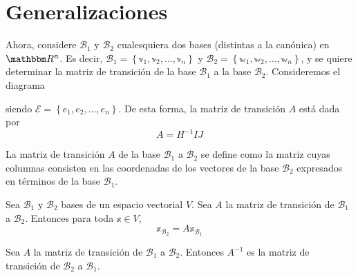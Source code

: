 \section*{Generalizaciones}

Ahora, considere $\mathcal{B}_1$ y $\mathcal{B}_2$ cualesquiera dos bases (distintas a la canónica) en $\RR[n]$. Es decir, $\mathcal{B}_1 = \left\{ \mathbb{v}_1, \mathbb{v}_2, \dots, \mathbb{v}_n \right\}$ y $\mathcal{B}_2 = \left\{ \mathbb{w}_1, \mathbb{w}_2, \dots, \mathbb{w}_n \right\}$, y se quiere determinar la matriz de transición de la base $\mathcal{B}_1$ a la base $\mathcal{B}_2$. Consideremos el diagrama
\begin{center}
\end{center}
siendo $\mathcal{E} = \left\{ e_1, e_2, \dots, e_n \right\}$. De esta forma, la matriz de transición $A$ está dada por
$$A = H^{-1}IJ$$

\begin{definition}
    La matriz de transición $A$ de la base $\mathcal{B}_1$ a $\mathcal{B}_2$ se define como la matriz cuyas columnas consisten en las coordenadas de los vectores de la base $\mathcal{B}_2$ expresados en términos de la base $\mathcal{B}_1$. 
\end{definition}

\begin{theorem}
    Sea $\mathcal{B}_1$ y $\mathcal{B}_2$ bases de un espacio vectorial $V$. Sea $A$ la matriz de transición de $\mathcal{B}_1$ a $\mathcal{B}_2$. Entonces para toda $\mathbb{x} \in V$,
    $$\mathbb{x}_{\mathcal{B}_2} = A\mathbb{x}_{\mathcal{B}_1}$$
\end{theorem}

\begin{theorem}
    Sea $A$ la matriz de transición de $\mathcal{B}_1$ a $\mathcal{B}_2$. Entonces $A^{-1}$ es la matriz de transición de $\mathcal{B}_2$ a $\mathcal{B}_1$.
\end{theorem}

